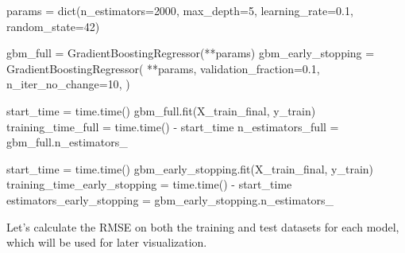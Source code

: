 \documentclass[
  letterpaper,
  DIV=11,
  numbers=noendperiod]{scrreprt}
\newenvironment{Shaded}{\begin{snugshade}}{\end{snugshade}}
\newcommand{\BuiltInTok}[1]{\textcolor[rgb]{0.00,0.23,0.31}{#1}}
\newcommand{\DecValTok}[1]{\textcolor[rgb]{0.68,0.00,0.00}{#1}}
\newcommand{\FloatTok}[1]{\textcolor[rgb]{0.68,0.00,0.00}{#1}}
\newcommand{\NormalTok}[1]{\textcolor[rgb]{0.00,0.23,0.31}{#1}}
\newcommand{\OperatorTok}[1]{\textcolor[rgb]{0.37,0.37,0.37}{#1}}
\begin{document}
\begin{Shaded}
\begin{Highlighting}[]
\NormalTok{params }\OperatorTok{=} \BuiltInTok{dict}\NormalTok{(n\_estimators}\OperatorTok{=}\DecValTok{2000}\NormalTok{, max\_depth}\OperatorTok{=}\DecValTok{5}\NormalTok{, learning\_rate}\OperatorTok{=}\FloatTok{0.1}\NormalTok{, random\_state}\OperatorTok{=}\DecValTok{42}\NormalTok{)}

\NormalTok{gbm\_full }\OperatorTok{=}\NormalTok{ GradientBoostingRegressor(}\OperatorTok{**}\NormalTok{params)}
\NormalTok{gbm\_early\_stopping }\OperatorTok{=}\NormalTok{ GradientBoostingRegressor(}
    \OperatorTok{**}\NormalTok{params,}
\NormalTok{    validation\_fraction}\OperatorTok{=}\FloatTok{0.1}\NormalTok{,}
\NormalTok{    n\_iter\_no\_change}\OperatorTok{=}\DecValTok{10}\NormalTok{,}
\NormalTok{)}

\NormalTok{start\_time }\OperatorTok{=}\NormalTok{ time.time()}
\NormalTok{gbm\_full.fit(X\_train\_final, y\_train)}
\NormalTok{training\_time\_full }\OperatorTok{=}\NormalTok{ time.time() }\OperatorTok{{-}}\NormalTok{ start\_time}
\NormalTok{n\_estimators\_full }\OperatorTok{=}\NormalTok{ gbm\_full.n\_estimators\_}

\NormalTok{start\_time }\OperatorTok{=}\NormalTok{ time.time()}
\NormalTok{gbm\_early\_stopping.fit(X\_train\_final, y\_train)}
\NormalTok{training\_time\_early\_stopping }\OperatorTok{=}\NormalTok{ time.time() }\OperatorTok{{-}}\NormalTok{ start\_time}
\NormalTok{estimators\_early\_stopping }\OperatorTok{=}\NormalTok{ gbm\_early\_stopping.n\_estimators\_}
\end{Highlighting}
\end{Shaded}

Let's calculate the RMSE on both the training and test datasets for each
model, which will be used for later visualization.
\end{document}
